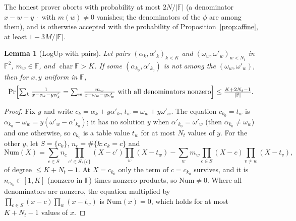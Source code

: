 \documentclass[11pt]{article}
\newtheorem{lemma}[theorem]{Lemma}
\theoremstyle{definition}
\newcommand{\F}{\mathbb{F}}
\newcommand{\iv}[2]{[#1,#2]}
\begin{document}
The honest prover aborts with probability at most $2N/|\F|$ (a denominator $x-w-y\,\cdot$ with $m(w)\ne0$ vanishes; the denominators of the $\phi$ are among them), and is otherwise accepted with the probability of Proposition~\ref{prop:affine}, at least $1-3M/|\F|$.

\begin{lemma}[LogUp with pairs]\label{lem:logup}
Let pairs $(\alpha_k,\alpha'_k)_{k<K}$ and $(\omega_w,\omega'_w)_{w<N_t}$ in $\F^2$, $m_w\in\F$, and $\operatorname{char}\F>K$. If some $(\alpha_{k_0},\alpha'_{k_0})$ is not among the $(\omega_w,\omega'_w)$, then for $x,y$ uniform in $\F$,
\[
\Pr\Bigl[\textstyle\sum_k\frac1{x-\alpha_k-y\alpha'_k}=\sum_w\frac{m_w}{x-\omega_w-y\omega'_w}\text{ with all denominators nonzero}\Bigr]\le\frac{K+2N_t-1}{|\F|}.
\]
\end{lemma}
\begin{proof}
Fix $y$ and write $c_k=\alpha_k+y\alpha'_k$, $t_w=\omega_w+y\omega'_w$. The equation $c_{k_0}=t_w$ is $\alpha_{k_0}-\omega_w=y(\omega'_w-\alpha'_{k_0})$; it has no solution $y$ when $\alpha'_{k_0}=\omega'_w$ (then $\alpha_{k_0}\ne\omega_w$) and one otherwise, so $c_{k_0}$ is a table value $t_w$ for at most $N_t$ values of $y$.
For the other $y$, let $S=\{c_k\}$, $n_c=\#\{k:c_k=c\}$ and
\[
\mathrm{Num}(X)=\sum_{c\in S}n_c\!\!\prod_{c'\in S\setminus\{c\}}\!\!(X-c')\prod_w(X-t_w)-\sum_wm_w\prod_{c\in S}(X-c)\prod_{v\ne w}(X-t_v),
\]
of degree $\le K+N_t-1$. At $X=c_{k_0}$ only the term of $c=c_{k_0}$ survives, and it is $n_{c_{k_0}}\in\iv1K$ (nonzero in $\F$) times nonzero products, so $\mathrm{Num}\ne0$. Where all denominators are nonzero, the equation multiplied by $\prod_{c\in S}(x-c)\prod_w(x-t_w)$ is $\mathrm{Num}(x)=0$, which holds for at most $K+N_t-1$ values of $x$.
\end{proof}
\end{document}
